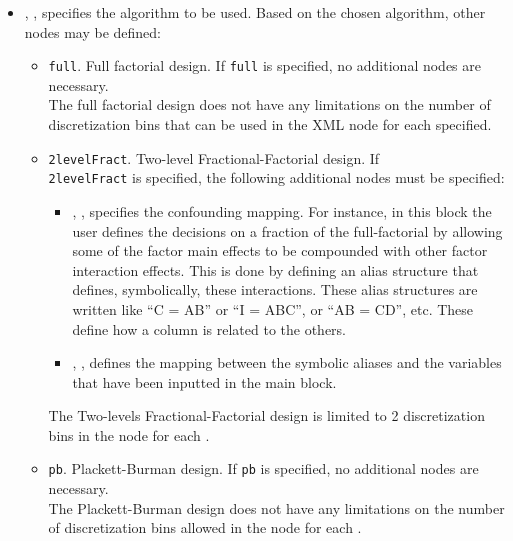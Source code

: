    \begin{itemize}
    \item {}, , specifies the
      algorithm to be used.
      Based on the chosen algorithm, other nodes may be defined:
      \begin{itemize}
        \item {}\texttt{full}. Full factorial design.
          If \texttt{full} is specified, no additional nodes are necessary.
          \\
          \nb The full factorial design does not have any limitations on the
          number of discretization bins that can be used in the 
          XML node for each  specified.
        \item {}\texttt{2levelFract}. Two-level
          Fractional-Factorial design.
          If \\\texttt{2levelFract}  is specified, the following additional
          nodes must be specified:
          \begin{itemize}
            \item {}, , specifies the confounding mapping.
              For instance, in this block the user defines the decisions on a
              fraction of the full-factorial by allowing some of the factor main
              effects to be compounded with other factor interaction effects.
              This is done by defining an alias structure that defines,
              symbolically, these interactions.
              These alias structures are written like “C = AB” or “I = ABC”, or
              “AB = CD”, etc.
              These define how a column is related to the others.
            \item {}, , defines the mapping between the  symbolic
              aliases and the variables that have been inputted in the
               main block.
          \end{itemize}
          \nb The Two-levels Fractional-Factorial design is limited to 2
          discretization bins in the  node for each
          .
       \item {}\texttt{pb}. Plackett-Burman design.
         If \texttt{pb} is specified, no additional nodes are necessary.
         \\
         \nb The Plackett-Burman design does not have any limitations on the
         number of discretization bins allowed in the  node for
         each .
      \end{itemize}

  \end{itemize}
